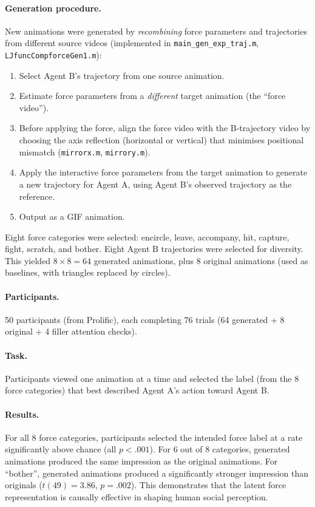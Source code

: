 \documentclass[11pt,a4paper]{article}
\begin{document}
\paragraph{Generation procedure.} New animations were generated by \emph{recombining} force parameters and trajectories from different source videos (implemented in \texttt{main\_gen\_exp\_traj.m}, \texttt{LJfuncCompforceGen1.m}):

\begin{enumerate}
    \item Select Agent B's trajectory from one source animation.
    \item Estimate force parameters from a \emph{different} target animation (the ``force video'').
    \item Before applying the force, align the force video with the B-trajectory video by choosing the axis reflection (horizontal or vertical) that minimises positional mismatch (\texttt{mirrorx.m}, \texttt{mirrory.m}).
    \item Apply the interactive force parameters from the target animation to generate a new trajectory for Agent A, using Agent B's observed trajectory as the reference.
    \item Output as a GIF animation.
\end{enumerate}

\noindent Eight force categories were selected: encircle, leave, accompany, hit, capture, fight, scratch, and bother. Eight Agent B trajectories were selected for diversity. This yielded $8 \times 8 = 64$ generated animations, plus 8 original animations (used as baselines, with triangles replaced by circles).

\paragraph{Participants.} 50 participants (from Prolific), each completing 76 trials (64 generated + 8 original + 4 filler attention checks).

\paragraph{Task.} Participants viewed one animation at a time and selected the label (from the 8 force categories) that best described Agent A's action toward Agent B.

\paragraph{Results.} For all 8 force categories, participants selected the intended force label at a rate significantly above chance (all $p < .001$). For 6 out of 8 categories, generated animations produced the same impression as the original animations. For ``bother'', generated animations produced a significantly stronger impression than originals ($t(49) = 3.86$, $p = .002$). This demonstrates that the latent force representation is causally effective in shaping human social perception.
\end{document}

